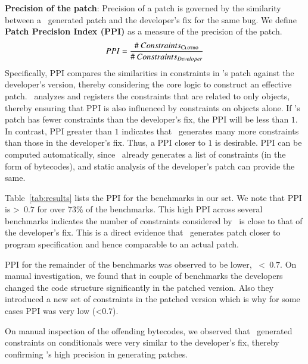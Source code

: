 \begin{mylist}
\item \textbf{Precision of the patch}: Precision of a patch is governed by the
similarity between a \tool\ generated patch and the developer's fix for the same
bug. We define \textbf{Patch Precision Index (PPI)} as a measure of the
precision of the patch. $$PPI =
\frac{\#~Constraints_{\textsc{Clotho}}}{\#~Constraints_{Developer}}$$
% 
Specifically, PPI compares the similarities in constraints in \tool's patch
against the developer's version, thereby considering the core logic to construct
an effective patch. \tool\ analyzes and registers the constraints that are
related to only  objects, thereby ensuring that PPI is also
influenced by constraints on  objects alone. If \tool's patch has
fewer constraints than the developer's fix, the PPI will be less than $1$. In
contrast, PPI greater than $1$ indicates that \tool\ generates many more
constraints than those in the developer's fix. Thus, a PPI closer to $1$ is
desirable. PPI can be computed automatically, since \tool\ already generates a
list of constraints (in the form of bytecodes), and static analysis of the
developer's patch can provide the same.

Table~\ref{tab:results} lists the PPI for the benchmarks in our set. We note
that PPI is \textgreater\ $0.7$ for over $73\%$ of the benchmarks. This high PPI
across several benchmarks indicates the number of  constraints
considered by \tool\ is close to that of the developer's fix. This is a direct
evidence that \tool\ generates patch closer to program specification and hence
comparable to an actual patch. PPI for the remainder
of the benchmarks was observed to be lower, \ie\ \textless\ $0.7$. On manual
investigation, we found that in couple of benchmarks the developers changed the code
structure significantly in the patched version. Also they introduced a new set of
constraints in the patched version which is why for some cases PPI was very low
(\textless $0.7$). On manual inspection of the
offending bytecodes, we observed that \tool\ generated constraints on
 conditionals were very similar to the developer's fix, thereby
confirming \tool's high precision in generating patches.


\end{mylist}
